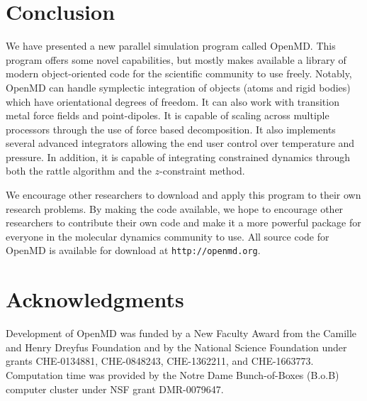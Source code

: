 \documentclass[]{book}
\begin{document}
\chapter{\label{section:conclusion}Conclusion}

We have presented a new parallel simulation program called {\sc
OpenMD}. This program offers some novel capabilities, but mostly makes
available a library of modern object-oriented code for the scientific
community to use freely.  Notably, {\sc OpenMD} can handle symplectic
integration of objects (atoms and rigid bodies) which have
orientational degrees of freedom.  It can also work with transition
metal force fields and point-dipoles. It is capable of scaling across
multiple processors through the use of force based decomposition. It
also implements several advanced integrators allowing the end user
control over temperature and pressure. In addition, it is capable of
integrating constrained dynamics through both the {\sc rattle}
algorithm and the $z$-constraint method.

We encourage other researchers to download and apply this program to
their own research problems.  By making the code available, we hope to
encourage other researchers to contribute their own code and make it a
more powerful package for everyone in the molecular dynamics community
to use.  All source code for {\sc OpenMD} is available for download at
{\tt http://openmd.org}.

\chapter{Acknowledgments}

Development of {\sc OpenMD} was funded by a New Faculty Award from the
Camille and Henry Dreyfus Foundation and by the National Science
Foundation under grants CHE-0134881, CHE-0848243, CHE-1362211, and
CHE-1663773. Computation time was provided by the Notre Dame
Bunch-of-Boxes (B.o.B) computer cluster under NSF grant DMR-0079647.



\end{document}
